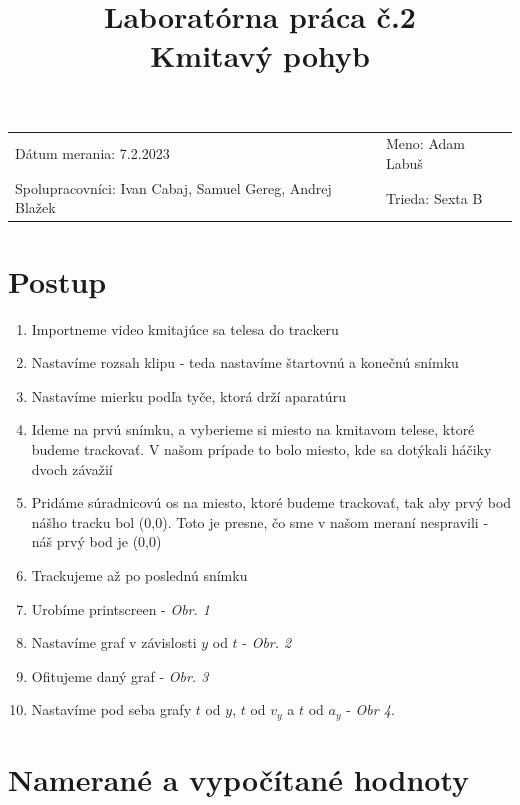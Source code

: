 \documentclass[11pt]{extarticle}
\title{%
Laboratórna práca č.2\\
Kmitavý pohyb
}
\author{}
\date{}
\begin{document}
	\maketitle
	\large
	\begin{tabular}{ll}
		Dátum merania: 7.2.2023 \hfill &Meno: Adam Labuš \\
		Spolupracovníci: Ivan Cabaj, Samuel Gereg, Andrej Blažek &Trieda: Sexta B \\
	\end{tabular}
	\vspace{50pt}
\section{Postup}
\begin{enumerate}
	\item Importneme video kmitajúce sa telesa do trackeru
	\item Nastavíme rozsah klipu - teda nastavíme štartovnú a konečnú snímku
	\item Nastavíme mierku podľa tyče, ktorá drží aparatúru
	\item Ideme na prvú snímku, a vyberieme si miesto na kmitavom telese, ktoré budeme trackovať. V našom prípade to bolo miesto, kde sa dotýkali háčiky dvoch závažií
	\item Pridáme súradnicovú os na miesto, ktoré budeme trackovať, tak aby prvý bod nášho tracku bol (0,0). Toto je presne, čo sme v našom meraní nespravili - náš prvý bod je (0,0)
	\item Trackujeme až po poslednú snímku
	\item Urobíme printscreen - \textit{Obr. 1}
	\item Nastavíme graf v závislosti $y$ od $t$ - \textit{Obr. 2}
	\item Ofitujeme daný graf - \textit{Obr. 3}
	\item Nastavíme pod seba grafy $t$ od $y$, $t$ od $v_y$ a $t$ od $a_y$ - \textit{Obr 4.}
\end{enumerate}
\section{Namerané a vypočítané hodnoty}
\end{document}
